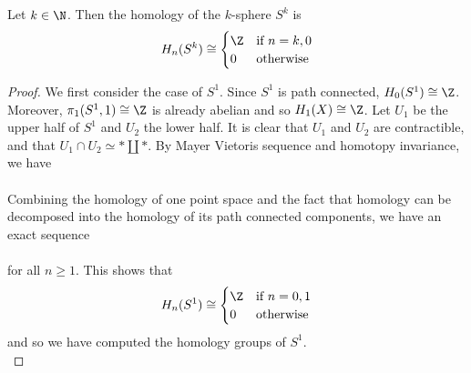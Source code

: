 \documentclass[a4paper]{article}
\begin{document}
\begin{eg}{}{} Let $k\in\N$. Then the homology of the $k$-sphere $S^k$ is $$H_n(S^k)\cong\begin{cases}
\Z & \text{if } n=k,0\\
0 & \text{otherwise}
\end{cases}$$ 
\begin{proof}
We first consider the case of $S^1$. Since $S^1$ is path connected, $H_0(S^1)\cong\Z$. Moreover, $\pi_1(S^1,1)\cong\Z$ is already abelian and so $H_1(X)\cong\Z$. Let $U_1$ be the upper half of $S^1$ and $U_2$ the lower half. It is clear that $U_1$ and $U_2$ are contractible, and that $U_1\cap U_2\simeq\ast\amalg\ast$. By Mayer Vietoris sequence and homotopy invariance, we have \\
\\
Combining the homology of one point space and the fact that homology can be decomposed into the homology of its path connected components, we have an exact sequence \\
\\
for all $n\geq 1$. This shows that $$H_n(S^1)\cong\begin{cases}
\Z & \text{if } n=0,1\\
0 & \text{otherwise}
\end{cases}$$ and so we have computed the homology groups of $S^1$. \\


\end{proof}
\end{eg}
\end{document}
